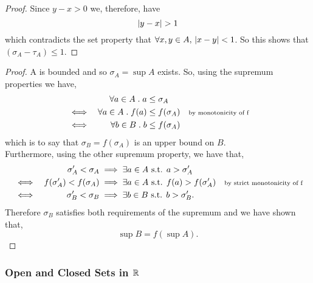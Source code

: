 \documentclass[../MathsNotesBase.tex]{subfiles}
\begin{document}
{\begin{proof}
			Since ${ y - x > 0 }$ we, therefore, have
			\[ \left\lvert y - x\right\rvert > 1 \]
			which contradicts the set property that $ \forall x,y \in A, \, \left\lvert x - y\right\rvert < 1 $. So this shows that $ (\sigma_A - \tau_A) \leq 1 $.
		\end{proof}
		
		
		\bigskip
		\begin{proof}
			A is bounded and so ${ \sigma_A = \sup A }$ exists. So, using the supremum properties we have,
			\begin{align*}
				&& \forall a \in A \;.\; a &\leq \sigma_A  \\
				&\iff & \forall a \in A \;.\; f(a)  &\leq f(\sigma_A)  &\text{\scriptsize{by monotonicity of f}}\\
				&\iff & \forall b \in B \;.\; b  &\leq f(\sigma_A) 
			\end{align*}
			which is to say that $\sigma_B = f(\sigma_A)$ is an upper bound on $B$.\\
			Furthermore, using the other supremum property, we have that,
			\begin{align*}
				&& \sigma_A' < \sigma_A &\implies \exists a \in A \text{ s.t. } a > \sigma_A' \\
				&\iff & f(\sigma_A') < f(\sigma_A)  &\implies \exists a \in A \text{ s.t. } f(a) > f(\sigma_A')  &\text{\scriptsize{by strict monotonicity of f}}\\
				&\iff & \sigma_B' < \sigma_B  &\implies \exists b \in B \text{ s.t. } b > \sigma_B'.	
			\end{align*}
			Therefore $\sigma_B$ satisfies both requirements of the supremum and we have shown that,
			\[ \sup B = f(\sup A). \]
		\end{proof}



	
		
\pagebreak



		\subsubsection{Open and Closed Sets in \texorpdfstring{$\mathbb{R}^{}$}{R}}
		\bigskip
		
}
\end{document}
